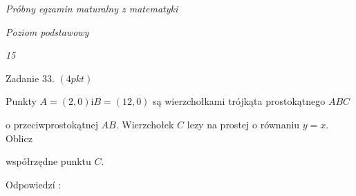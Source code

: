 \documentclass[a4paper,12pt]{article}
\begin{document}
{\it Próbny egzamin maturalny z matematyki}

{\it Poziom podstawowy}

{\it 15}

Zadanie 33. $(4pkt)$

Punkty $A=(2,0) \mathrm{i} B=(12,0)$ są wierzchołkami trójkąta prostokątnego $ABC$

o przeciwprostokątnej $AB$. Wierzchołek $C$ lezy na prostej o równaniu $y=x$. Oblicz

współrzędne punktu $C.$

Odpowiedzí :
\end{document}
